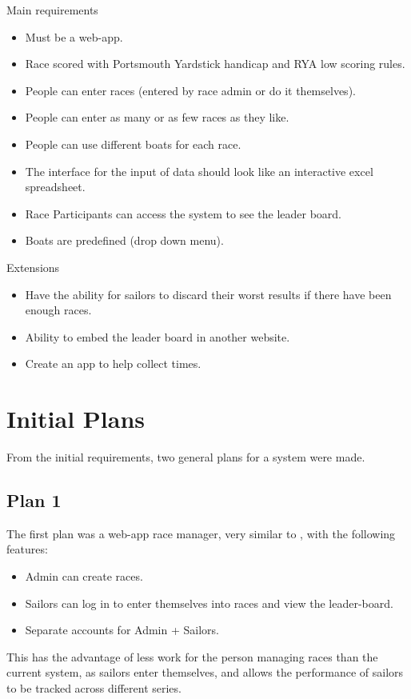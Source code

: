 \documentclass{l4proj}
\begin{document}
Main requirements
\begin{itemize}
    \item
    Must be a web-app.
    \item
    Race scored with Portsmouth Yardstick handicap and RYA low scoring rules.
    \item
    People can enter races (entered by race admin or do it themselves).
    \item
    People can enter as many or as few races as they like.
    \item
    People can use different boats for each race.
    \item
    The interface for the input of data should look like an interactive excel spreadsheet.
    \item
    Race Participants can access the system to see the leader board.
    \item
    Boats are predefined (drop down menu).
\end{itemize}
Extensions
\begin{itemize}
    \item
    Have the ability for sailors to discard their worst results if there have been enough races.
    \item
    Ability to embed  the leader board in another website.
    \item
    Create an app to help collect times.
\end{itemize}

\section{Initial Plans}
From the initial requirements, two general plans for a system were made.
\subsection{Plan 1}
The first plan was a web-app race manager, very similar to \citet{SailEvent}, with the following features:
\begin{itemize}
    \item
    Admin can create races.
    \item
    Sailors can log in to enter themselves into races and view the leader-board.
    \item
    Separate accounts for Admin + Sailors.
\end{itemize}

This has the advantage of less work for the person managing races than the current system, as sailors enter themselves, and allows the performance of sailors to be tracked across different series.
\end{document}
